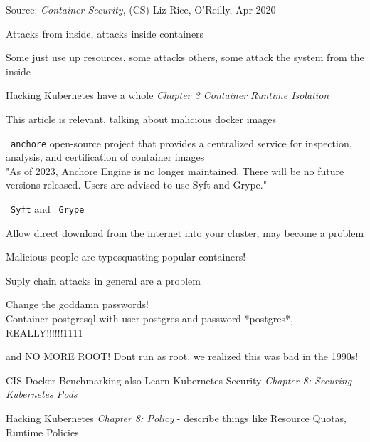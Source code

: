 \documentclass[Screen16to9,17pt]{foils}
\begin{document}

Source: \emph{Container Security}, (CS) Liz Rice, O'Reilly, Apr 2020

\begin{list2}
\item Attacks from inside, attacks inside containers
\item Some just use up resources, some attacks others, some attack the system from the inside
\item Hacking Kubernetes have a whole \emph{Chapter 3 Container Runtime Isolation}
\end{list2}



This article is relevant, talking about malicious docker images\\


\begin{list2}
\item \faWrench\ \verb+anchore+ open-source project that provides a centralized service for inspection, analysis, and certification of container images
\\
"As of 2023, Anchore Engine is no longer maintained. There will be no future versions released. Users are advised to use Syft and Grype."
\item \faWrench\ \verb+Syft+  and \faWrench\ \verb+Grype+ 
\item Allow direct download from the internet into your cluster, may become a problem
\item Malicious people are typosquatting popular containers!
\item Suply chain attacks in general are a problem
\end{list2}


\begin{list2}
\item Change the goddamn passwords!\\
Container postgresql with user postgres and password *postgres*, REALLY!!!!!!1111
\item and NO MORE ROOT! Dont run as root, we realized this was bad in the 1990s!
\item CIS Docker Benchmarking also Learn Kubernetes Security \emph{Chapter 8: Securing Kubernetes Pods}
\item Hacking Kubernetes \emph{Chapter 8: Policy} - describe things like Resource Quotas, Runtime Policies
\end{list2}
\end{document}
